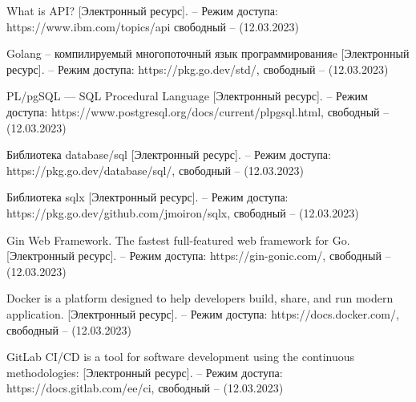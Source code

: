 \begin{thebibliography}{}
		
		What is API?  [Электронный ресурс]. -- Режим доступа: https://www.ibm.com/topics/api свободный -- (12.03.2023)
		 
		
		Golang -- компилируемый многопоточный язык программированияe  [Электронный ресурс]. -- Режим доступа: https://pkg.go.dev/std/, свободный -- (12.03.2023)
		
		PL/pgSQL — SQL Procedural Language [Электронный ресурс]. -- Режим доступа: https://www.postgresql.org/docs/current/plpgsql.html, свободный -- (12.03.2023)
		
		
		Библиотека database/sql [Электронный ресурс]. -- Режим доступа: https://pkg.go.dev/database/sql/,
		свободный -- (12.03.2023)
		
		Библиотека sqlx [Электронный ресурс]. -- Режим доступа: https://pkg.go.dev/github.com/jmoiron/sqlx,
		свободный -- (12.03.2023)
		
		Gin Web Framework. The fastest full-featured web framework for Go. [Электронный ресурс]. -- Режим доступа: https://gin-gonic.com/, свободный -- (12.03.2023)
		
		
		Docker is a platform designed to help developers build, share, and run modern application. [Электронный ресурс]. -- Режим доступа: https://docs.docker.com/, свободный -- (12.03.2023)
		
		
		GitLab CI/CD is a tool for software development using the continuous methodologies: [Электронный ресурс]. -- Режим доступа: https://docs.gitlab.com/ee/ci,  свободный -- (12.03.2023)
	
	

\end{thebibliography}
\endgroup

\pagebreak